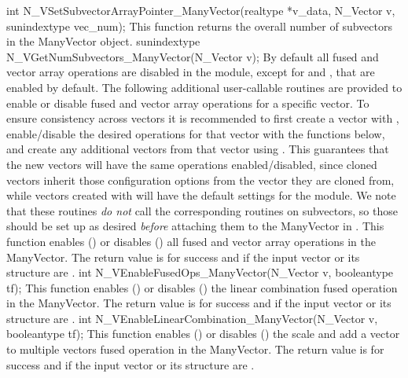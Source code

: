{
  int N\_VSetSubvectorArrayPointer\_ManyVector(realtype *v\_data, N\_Vector v, sunindextype vec\_num);
}
{
  This function returns the overall number of subvectors in the
  ManyVector object.
}
{
  sunindextype N\_VGetNumSubvectors\_ManyVector(N\_Vector v);
}
By default all fused and vector array operations are disabled in the {\nvecmanyvector}
module, except for  and
, that are enabled by default. The
following additional user-callable routines are provided to enable or
disable fused and vector array operations for a specific vector. To
ensure consistency across vectors it is recommended to first create a
vector with ,
enable/disable the desired operations for that vector with the
functions below, and create any additional vectors from that vector
using . This guarantees that the new vectors will have
the same operations enabled/disabled, since cloned vectors inherit
those configuration options from the vector they are cloned from, while
vectors created with 
will have the default settings for the
{\nvecmanyvector} module.  We note that these routines \emph{do not}
call the corresponding routines on subvectors, so those should be set up
as desired \emph{before} attaching them to the ManyVector in
.
{
  This function enables () or disables () all fused and
  vector array operations in the ManyVector. The return value is  for
  success and  if the input vector or its  structure are .
}
{
  int N\_VEnableFusedOps\_ManyVector(N\_Vector v, booleantype tf);
}
{
  This function enables () or disables () the linear
  combination fused operation in the ManyVector. The return value is  for
  success and  if the input vector or its  structure are .
}
{
  int N\_VEnableLinearCombination\_ManyVector(N\_Vector v, booleantype tf);
}
{
  This function enables () or disables () the scale and
  add a vector to multiple vectors fused operation in the ManyVector. The
  return value is  for success and  if the input vector or its
   structure are .
}
